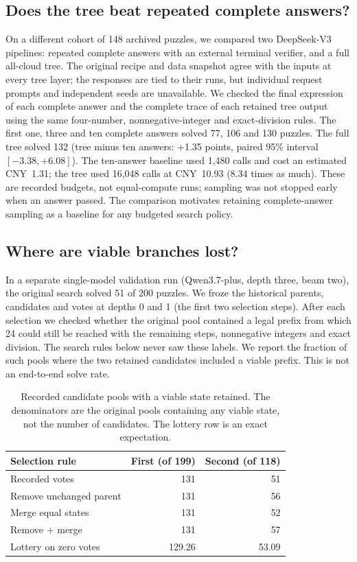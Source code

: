 \subsection{Does the tree beat repeated complete answers?}
On a different cohort of 148 archived puzzles, we compared two DeepSeek-V3 pipelines: repeated complete answers with an external terminal verifier, and a full all-cloud tree. The original recipe and data snapshot agree with the inputs at every tree layer; the responses are tied to their runs, but individual request prompts and independent seeds are unavailable. We checked the final expression of each complete answer and the complete trace of each retained tree output using the same four-number, nonnegative-integer and exact-division rules. The first one, three and ten complete answers solved 77, 106 and 130 puzzles. The full tree solved 132 (tree minus ten answers: +1.35 points, paired 95\% interval $[-3.38, +6.08]$). The ten-answer baseline used 1,480 calls and cost an estimated CNY~1.31; the tree used 16,048 calls at CNY~10.93 (8.34 times as much). These are recorded budgets, not equal-compute runs; sampling was not stopped early when an answer passed. The comparison motivates retaining complete-answer sampling as a baseline for any budgeted search policy.

\subsection{Where are viable branches lost?}
In a separate single-model validation run (Qwen3.7-plus, depth three, beam two), the original search solved 51 of 200 puzzles. We froze the historical parents, candidates and votes at depths 0 and 1 (the first two selection steps). After each selection we checked whether the original pool contained a legal prefix from which 24 could still be reached with the remaining steps, nonnegative integers and exact division. The search rules below never saw these labels. We report the fraction of such pools where the two retained candidates included a viable prefix. This is not an end-to-end solve rate.

\begin{table}[tb]
\centering\small
\caption{Recorded candidate pools with a viable state retained. The denominators are the original pools containing any viable state, not the number of candidates. The lottery row is an exact expectation.}
\label{tab:jt-replay}
\setlength{\tabcolsep}{4pt}
\begin{tabular}{@{}lrr@{}}\toprule
Selection rule & First (of 199) & Second (of 118) \\ \midrule
Recorded votes & 131 & 51 \\
Remove unchanged parent & 131 & 56 \\
Merge equal states & 131 & 52 \\
Remove + merge & 131 & 57 \\
Lottery on zero votes & 129.26 & 53.09 \\
\bottomrule\end{tabular}
\end{table}

